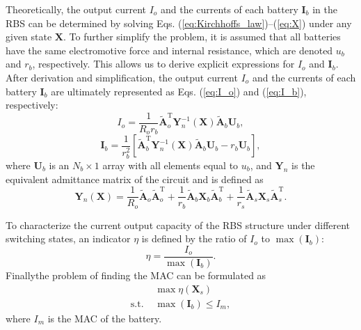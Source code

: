 \documentclass{article}
\def\T{\mathrm{T}}
\providecommand{\DIFadd}[1]{{\protect\color{blue}\uwave{#1}}} %
\providecommand{\DIFaddbegin}{} %
\providecommand{\DIFaddend}{} %
\newcommand{\DIFaddincludegraphics}[2][]{{\color{blue}\fbox{\DIFOincludegraphics[#1]{#2}}}} %
\DeclareRobustCommand{\DIFaddbegin}{\DIFOaddbegin \let\includegraphics\DIFaddincludegraphics} %
\DeclareRobustCommand{\DIFaddend}{\DIFOaddend \let\includegraphics\DIFOincludegraphics} %
\begin{document}
Theoretically, the output current $I_o$ and the currents of each battery $\bm{I}_b$ in the RBS can be determined by solving Eqs. (\ref{eq:Kirchhoffs_law})--(\ref{eq:X}) under any given state $\bm{X}$.
To further simplify the problem, it is assumed that all batteries have the same electromotive force and internal resistance, which are denoted $u_b$ and $r_b$, respectively.
This allows us to derive explicit expressions for $I_o$ and $\bm{I}_b$.
After derivation and simplification, the output current $I_o$ and the currents of each battery $\bm{I}_b$ are ultimately represented as \DIFaddbegin \DIFadd{in }\DIFaddend Eqs. (\ref{eq:I_o}) and (\ref{eq:I_b}), respectively:
\begin{equation}\label{eq:I_o}
    I_o = \frac{1}{R_o r_b} \bm{\tilde{A}}_o^\T \bm{Y}_n^{-1}(\bm{X}) \bm{\tilde{A}}_b \bm{U}_b,
\end{equation}
\begin{equation}\label{eq:I_b}
    \bm{I}_b = \frac{1}{r_b^2}[\bm{\tilde{A}}_b^\T \bm{Y}_n^{-1}(\bm{X}) \bm{\tilde{A}}_b\bm{U}_b -r_b \bm{U}_b],
\end{equation}
where $\bm{U}_b$ is an $N_b\times 1$ array with all elements equal to $u_b$,
and $\bm{Y}_n$ is the equivalent admittance matrix of the circuit and is defined as
\begin{equation}\label{eq:Yn}
    \bm{Y}_n (\bm{X}) = \frac{1}{R_o} \bm{\tilde{A}}_o\bm{\tilde{A}}_o^\T + \frac{1}{r_b} \bm{\tilde{A}}_b\bm{X}_b\bm{\tilde{A}}_b^\T + \frac{1}{r_s}\bm{\tilde{A}}_s\bm{X}_s\bm{\tilde{A}}_s^\T.
\end{equation}


To characterize the current output capacity of the RBS structure under different switching states, an indicator $\eta$ is defined by the ratio of $I_o$ to $\max (\bm{I}_b)$:
\begin{equation}\label{eq:eta}
    \eta = \frac{I_o}{\max (\bm{I}_b)}.
\end{equation}
Finally\DIFaddbegin \DIFadd{, }\DIFaddend the problem of finding the MAC can be formulated as
\begin{align}
    & \max \eta(\bm{X}_s) \label{eq:max_eta}\\
    \text{s.t. } & \max (\bm{I}_b) \leq I_m, \label{eq:Ib_leq_Im}
\end{align}
where $I_m$ is the MAC of the battery.
\end{document}
